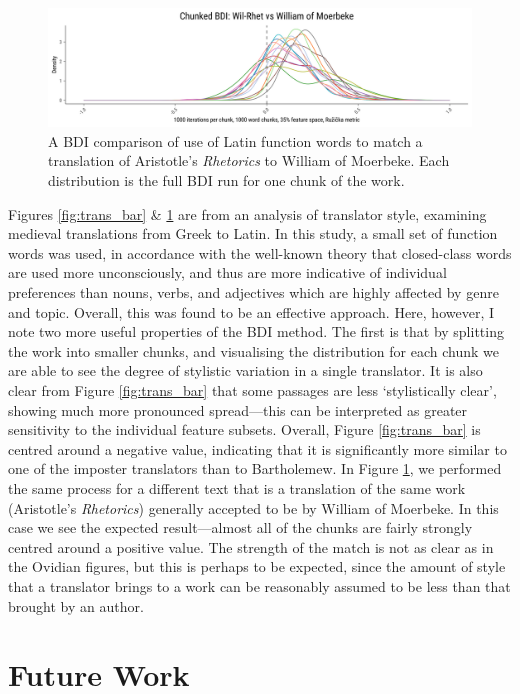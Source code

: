 \documentclass[
    hf
]{ceurart}
\begin{document}
\begin{figure}
    \includegraphics[width=\linewidth]{figures/bdi_wil_paper.png}
    \caption{A BDI comparison of use of Latin function words to match a
        translation of Aristotle's \emph{Rhetorics} to William of Moerbeke. Each
        distribution is the full BDI run for one chunk of the work.}
    \label{fig:trans_wil}
\end{figure}

Figures \ref{fig:trans_bar} \& \ref{fig:trans_wil} are from an analysis of
translator style, examining medieval translations from Greek to Latin. In this
study, a small set of function words was used, in accordance with the well-known
theory that closed-class words are used more unconsciously, and thus are more
indicative of individual preferences than nouns, verbs, and adjectives which are
highly affected by genre and topic. Overall, this was found to be an effective
approach. Here, however, I note two more useful properties of the BDI method.
The first is that by splitting the work into smaller chunks, and visualising the
distribution for each chunk we are able to see the degree of stylistic variation
in a single translator. It is also clear from Figure \ref{fig:trans_bar} that
some passages are less `stylistically clear', showing much more pronounced
spread---this can be interpreted as greater sensitivity to the individual
feature subsets. Overall, Figure \ref{fig:trans_bar} is centred around a
negative value, indicating that it is significantly more similar to one of the
imposter translators than to Bartholemew. In Figure \ref{fig:trans_wil}, we
performed the same process for a different text that is a translation of the
same work (Aristotle's \emph{Rhetorics}) generally accepted to be by William of
Moerbeke. In this case we see the expected result---almost all of the chunks are
fairly strongly centred around a positive value. The strength of the match is
not as clear as in the Ovidian figures, but this is perhaps to be expected,
since the amount of style that a translator brings to a work can be reasonably
assumed to be less than that brought by an author.

\section{Future Work}
\end{document}
